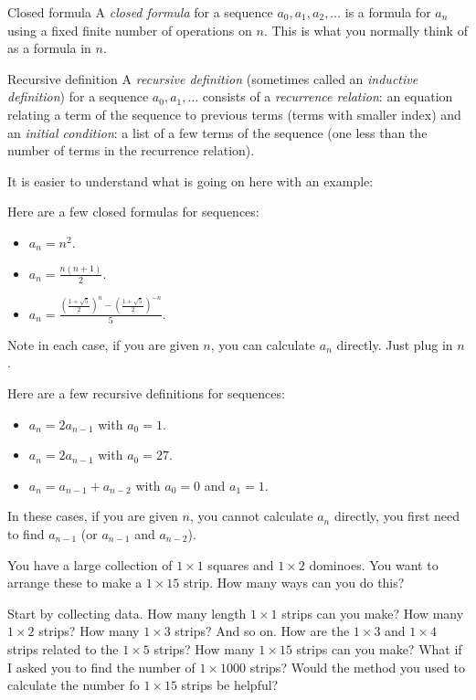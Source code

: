 \documentclass[12pt]{article}
\begin{document}
\begin{defbox}{Closed formula}
 A {\em closed formula} for a sequence $a_0, a_1, a_2,\ldots$ is a formula for $a_n$ using a fixed finite number of operations on $n$.  This is what you normally think of as a formula in $n$.
\end{defbox}

\begin{defbox}{Recursive definition}
 A {\em recursive definition} (sometimes called an {\em inductive definition}) for a sequence $a_0, a_1, \ldots$ consists of a {\em recurrence relation}: an equation relating a term of the sequence to previous terms (terms with smaller index) and an {\em initial condition}: a list of a few terms of the sequence (one less than the number of terms in the recurrence relation).
\end{defbox}

It is easier to understand what is going on here with an example:

\begin{example}
 Here are a few closed formulas for sequences:
 \begin{itemize}
  \item $a_n = n^2$.
  \item $a_n = \frac{n(n+1)}{2}$.
  \item $a_n = \frac{\left(\frac{1 + \sqrt 5}{2}\right)^n - \left(\frac{1 + \sqrt 5}{2}\right)^{-n}}{5}$.
 \end{itemize}
 Note in each case, if you are given $n$, you can calculate $a_n$ directly. Just plug in $n$.

 Here are a few recursive definitions for sequences:
 \begin{itemize}
  \item $a_n = 2a_{n-1}$ with $a_0 = 1$.
  \item $a_n = 2a_{n-1}$ with $a_0 = 27$.
  \item $a_n = a_{n-1} + a_{n-2}$ with $a_0 = 0$ and $a_1 = 1$.
 \end{itemize}
  In these cases, if you are given $n$, you cannot calculate $a_n$ directly, you first need to find $a_{n-1}$ (or $a_{n-1}$ and $a_{n-2}$). 
\end{example}


\begin{activity}
You have a large collection of $1\times 1$ squares and $1\times 2$ dominoes.  You want to arrange these to make a $1 \times 15$ strip.  How many ways can you do this?
\begin{questions}
  \question Start by collecting data.  How many length $1\times 1$ strips can you make?  How many $1\times 2$ strips?  How many $1\times 3$ strips?  And so on.
  \question How are the $1\times 3$ and $1 \times 4$ strips related to the $1\times 5$ strips?
  \question How many $1\times 15$ strips can you make?
  \question What if I asked you to find the number of $1\times 1000$ strips?  Would the method you used to calculate the number fo  $1 \times 15$ strips be helpful?

\end{questions}
\end{activity}
\end{document}
